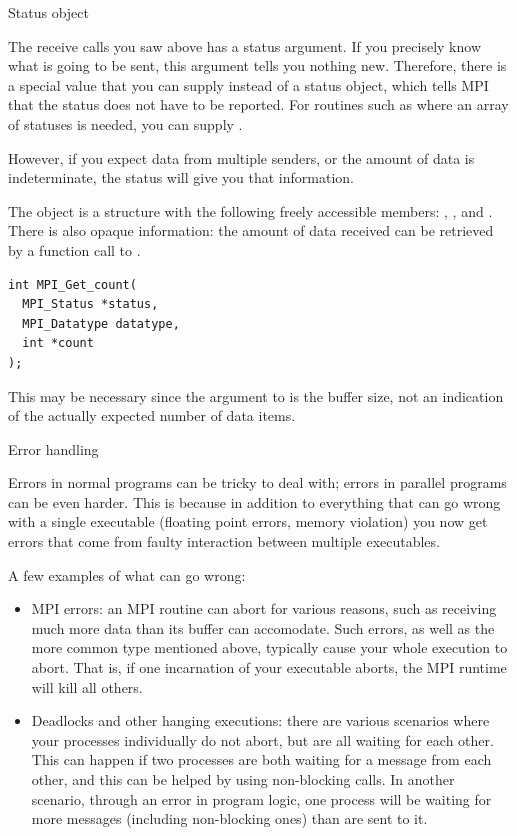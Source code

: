  {Status object}

The receive calls you saw above has a status argument. If you 
precisely know what is going to be sent, this argument tells you 
nothing new. Therefore, there is a special value 
that you can supply instead of a status object, which tells MPI that the 
status does not have to be reported. For routines such as 
where an array of statuses is needed, you can supply .

However, if you expect data from multiple senders,
or the amount of data is indeterminate, the status will give
you that information.

The  object is a structure with the following 
freely accessible members:
, , and . There is also opaque 
information: the amount of data received can be retrieved by 
a function call to .
\begin{verbatim}
int MPI_Get_count(
  MPI_Status *status,
  MPI_Datatype datatype,
  int *count
);
\end{verbatim}
This may be necessary since the  argument to  is 
the buffer size, not an indication of the actually expected number of
data items.

 {Error handling}

Errors in normal programs can be tricky to deal with; errors in
parallel programs can be even harder. This is because in addition to
everything that can go wrong with a single executable (floating point
errors, memory violation) you now get errors that come from faulty
interaction between multiple executables.

A few examples of what can go wrong:
\begin{itemize}
\item MPI errors: an MPI routine can abort for various reasons, such
  as receiving much more data than its buffer can accomodate. Such
  errors, as well as the more common type mentioned above, typically
  cause your whole execution to abort. That is, if one incarnation of
  your executable aborts, the MPI runtime will kill all others.
\item Deadlocks and other hanging executions: there are various
  scenarios where your processes individually do not abort, but are all
  waiting for each other. This can happen if two processes are both
  waiting for a message from each other, and this can be helped by
  using non-blocking calls. In another scenario, through an error in
  program logic, one process will be waiting for more messages
  (including non-blocking ones) than are sent to it.
\end{itemize}


